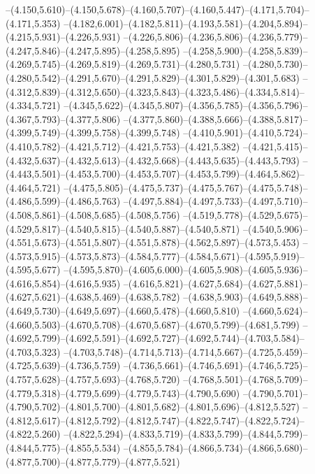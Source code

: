   --(4.150,5.610)--(4.150,5.678)--(4.160,5.707)--(4.160,5.447)--(4.171,5.704)--(4.171,5.353)%
  --(4.182,6.001)--(4.182,5.811)--(4.193,5.581)--(4.204,5.894)--(4.215,5.931)--(4.226,5.931)%
  --(4.226,5.806)--(4.236,5.806)--(4.236,5.779)--(4.247,5.846)--(4.247,5.895)--(4.258,5.895)%
  --(4.258,5.900)--(4.258,5.839)--(4.269,5.745)--(4.269,5.819)--(4.269,5.731)--(4.280,5.731)%
  --(4.280,5.730)--(4.280,5.542)--(4.291,5.670)--(4.291,5.829)--(4.301,5.829)--(4.301,5.683)%
  --(4.312,5.839)--(4.312,5.650)--(4.323,5.843)--(4.323,5.486)--(4.334,5.814)--(4.334,5.721)%
  --(4.345,5.622)--(4.345,5.807)--(4.356,5.785)--(4.356,5.796)--(4.367,5.793)--(4.377,5.806)%
  --(4.377,5.860)--(4.388,5.666)--(4.388,5.817)--(4.399,5.749)--(4.399,5.758)--(4.399,5.748)%
  --(4.410,5.901)--(4.410,5.724)--(4.410,5.782)--(4.421,5.712)--(4.421,5.753)--(4.421,5.382)%
  --(4.421,5.415)--(4.432,5.637)--(4.432,5.613)--(4.432,5.668)--(4.443,5.635)--(4.443,5.793)%
  --(4.443,5.501)--(4.453,5.700)--(4.453,5.707)--(4.453,5.799)--(4.464,5.862)--(4.464,5.721)%
  --(4.475,5.805)--(4.475,5.737)--(4.475,5.767)--(4.475,5.748)--(4.486,5.599)--(4.486,5.763)%
  --(4.497,5.884)--(4.497,5.733)--(4.497,5.710)--(4.508,5.861)--(4.508,5.685)--(4.508,5.756)%
  --(4.519,5.778)--(4.529,5.675)--(4.529,5.817)--(4.540,5.815)--(4.540,5.887)--(4.540,5.871)%
  --(4.540,5.906)--(4.551,5.673)--(4.551,5.807)--(4.551,5.878)--(4.562,5.897)--(4.573,5.453)%
  --(4.573,5.915)--(4.573,5.873)--(4.584,5.777)--(4.584,5.671)--(4.595,5.919)--(4.595,5.677)%
  --(4.595,5.870)--(4.605,6.000)--(4.605,5.908)--(4.605,5.936)--(4.616,5.854)--(4.616,5.935)%
  --(4.616,5.821)--(4.627,5.684)--(4.627,5.881)--(4.627,5.621)--(4.638,5.469)--(4.638,5.782)%
  --(4.638,5.903)--(4.649,5.888)--(4.649,5.730)--(4.649,5.697)--(4.660,5.478)--(4.660,5.810)%
  --(4.660,5.624)--(4.660,5.503)--(4.670,5.708)--(4.670,5.687)--(4.670,5.799)--(4.681,5.799)%
  --(4.692,5.799)--(4.692,5.591)--(4.692,5.727)--(4.692,5.744)--(4.703,5.584)--(4.703,5.323)%
  --(4.703,5.748)--(4.714,5.713)--(4.714,5.667)--(4.725,5.459)--(4.725,5.639)--(4.736,5.759)%
  --(4.736,5.661)--(4.746,5.691)--(4.746,5.725)--(4.757,5.628)--(4.757,5.693)--(4.768,5.720)%
  --(4.768,5.501)--(4.768,5.709)--(4.779,5.318)--(4.779,5.699)--(4.779,5.743)--(4.790,5.690)%
  --(4.790,5.701)--(4.790,5.702)--(4.801,5.700)--(4.801,5.682)--(4.801,5.696)--(4.812,5.527)%
  --(4.812,5.617)--(4.812,5.792)--(4.812,5.747)--(4.822,5.747)--(4.822,5.724)--(4.822,5.260)%
  --(4.822,5.294)--(4.833,5.719)--(4.833,5.799)--(4.844,5.799)--(4.844,5.775)--(4.855,5.534)%
  --(4.855,5.784)--(4.866,5.734)--(4.866,5.680)--(4.877,5.700)--(4.877,5.779)--(4.877,5.521)%
